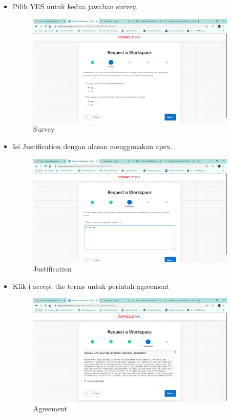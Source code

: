 \begin{itemize}
    \item Pilih YES untuk kedua jawaban survey.
    \begin{figure}[!htbp]
        \centering
        \includegraphics[width=10cm]{figures/work3.PNG}
        \caption{Survey}
    \end{figure}
    
    \item Isi Justification dengan alasan menggunakan apex.
    \begin{figure}[!htbp]
        \centering
        \includegraphics[width=10cm]{figures/work4.PNG}
        \caption{Justification}
    \end{figure}
    \newpage
    
    \item Klik i accept the terms untuk perintah agreement
    \begin{figure}[!htbp]
        \centering
        \includegraphics[width=10cm]{figures/work5.PNG}
        \caption{Agreement}
    \end{figure}
    

\end{itemize}
